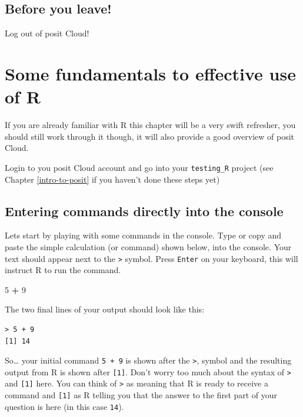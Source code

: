 \documentclass[
]{book}
\newenvironment{Shaded}{\begin{snugshade}}{\end{snugshade}}
\newcommand{\DecValTok}[1]{\textcolor[rgb]{0.00,0.00,0.81}{#1}}
\newcommand{\SpecialCharTok}[1]{\textcolor[rgb]{0.81,0.36,0.00}{\textbf{#1}}}
\begin{document}
\hypertarget{before-you-leave}{%
\section{Before you leave!}\label{before-you-leave}}

Log out of posit Cloud!

\hypertarget{c2}{%
\chapter{Some fundamentals to effective use of R}\label{c2}}

If you are already familiar with R this chapter will be a very swift refresher, you should still work through it though, it will also provide a good overview of posit Cloud.

Login to you posit Cloud account and go into your \texttt{testing\_R} project (see Chapter \ref{intro-to-posit} if you haven't done these steps yet)

\hypertarget{entering-commands-directly-into-the-console}{%
\section{Entering commands directly into the console}\label{entering-commands-directly-into-the-console}}

Lets start by playing with some commands in the console. Type or copy and paste the simple calculation (or command) shown below, into the console. Your text should appear next to the \texttt{\textgreater{}} symbol. Press \texttt{Enter} on your keyboard, this will instruct R to run the command.

\begin{Shaded}
\begin{Highlighting}[]
\DecValTok{5} \SpecialCharTok{+} \DecValTok{9}
\end{Highlighting}
\end{Shaded}

The two final lines of your output should look like this:

\begin{verbatim}
> 5 + 9
[1] 14
\end{verbatim}

So\ldots{} your initial command \texttt{5\ +\ 9} is shown after the \texttt{\textgreater{}}, symbol and the resulting output from R is shown after \texttt{{[}1{]}}. Don't worry too much about the syntax of \texttt{\textgreater{}} and \texttt{{[}1{]}} here. You can think of \texttt{\textgreater{}} as meaning that R is ready to receive a command and \texttt{{[}1{]}} as R telling you that the answer to the first part of your question is here (in this case \texttt{14}).
\end{document}
